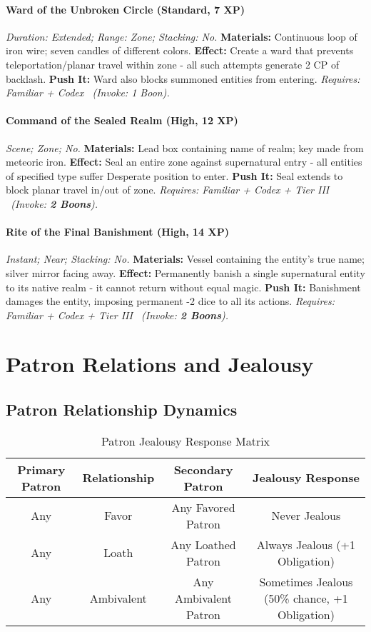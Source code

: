 \documentclass[12pt,twoside]{book}
\begin{document}
\paragraph{Ward of the Unbroken Circle (Standard, 7 XP)} \emph{Duration: Extended; Range: Zone; Stacking: No.}
\textbf{Materials:} Continuous loop of iron wire; seven candles of different colors.
\textbf{Effect:} Create a ward that prevents teleportation/planar travel within zone - all such attempts generate 2 CP of backlash.
\textbf{Push It:} Ward also blocks summoned entities from entering.
\emph{Requires: Familiar + Codex \ (\textit{Invoke:} 1 Boon).}
\paragraph{Command of the Sealed Realm (High, 12 XP)} \emph{Scene; Zone; No.}
\textbf{Materials:} Lead box containing name of realm; key made from meteoric iron.
\textbf{Effect:} Seal an entire zone against supernatural entry - all entities of specified type suffer Desperate position to enter.
\textbf{Push It:} Seal extends to block planar travel in/out of zone.
\emph{Requires: Familiar + Codex + Tier III \ (\textit{Invoke:} \textbf{2 Boons}).}
\paragraph{Rite of the Final Banishment (High, 14 XP)} \emph{Instant; Near; Stacking: No.}
\textbf{Materials:} Vessel containing the entity's true name; silver mirror facing away.
\textbf{Effect:} Permanently banish a single supernatural entity to its native realm - it cannot return without equal magic.
\textbf{Push It:} Banishment damages the entity, imposing permanent -2 dice to all its actions.
\emph{Requires: Familiar + Codex + Tier III \ (\textit{Invoke:} \textbf{2 Boons}).}

\section{Patron Relations and Jealousy}

\subsection{Patron Relationship Dynamics}

\begin{table}[htbp]
\centering
\begin{tabular}{|c|c|c|c|}
\hline
\textbf{Primary Patron} & \textbf{Relationship} & \textbf{Secondary Patron} & \textbf{Jealousy Response} \\
\hline
Any & Favor & Any Favored Patron & Never Jealous \\
\hline
Any & Loath & Any Loathed Patron & Always Jealous (+1 Obligation) \\
\hline
Any & Ambivalent & Any Ambivalent Patron & Sometimes Jealous (50\% chance, +1 Obligation) \\
\hline
\end{tabular}
\caption{Patron Jealousy Response Matrix}
\end{table}
\end{document}
